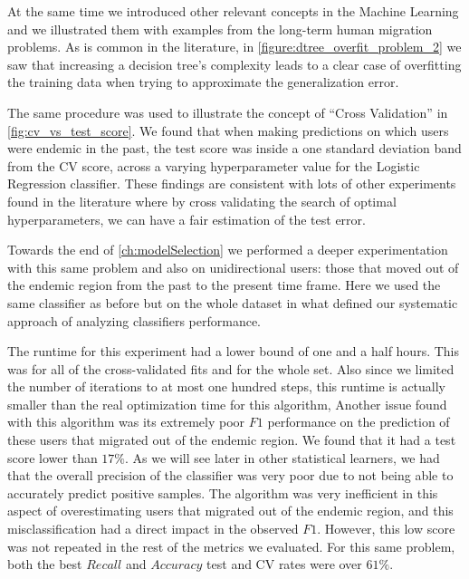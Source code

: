 At the same time we introduced other relevant concepts in the Machine Learning and we illustrated them with examples from the long-term human migration problems.
As is common in the literature, in \cref{figure:dtree_overfit_problem_2} we saw that increasing a decision tree's complexity leads to a clear case of overfitting the training data when trying to approximate the generalization error.

The same procedure was used to illustrate the concept of ``Cross Validation'' in \cref{fig:cv_vs_test_score}.
We found that when making predictions on which users were endemic in the past, the test score was inside a one standard deviation band from the CV score, across a varying hyperparameter value for the Logistic Regression classifier.
These findings are consistent with lots of other experiments found in the literature where by cross validating the search of optimal hyperparameters, we can have a fair estimation of the test error.


Towards the end of \cref{ch:modelSelection} we performed a deeper experimentation with this same problem and also on unidirectional users: those that moved out of the endemic region from the past to the present time frame.
Here we used the same classifier as before but on the whole dataset in what defined our systematic approach of analyzing classifiers performance.



The runtime for this experiment had a lower bound of one and a half hours.
This was for all of the cross-validated fits and for the whole set.
Also since we limited the number of iterations to at most one hundred steps, this runtime is actually smaller than the real optimization time for this algorithm,
Another issue found with this algorithm was its extremely poor $F1$ performance on the prediction of these users that migrated out of the endemic region.
We found that it had a test score lower than $17\%$.
As we will see later in other statistical learners, we had that the overall precision of the classifier was very poor due to not being able to accurately predict positive samples.
The algorithm was very inefficient in this aspect of overestimating users that migrated out of the endemic region, and this misclassification had a direct impact in the observed $F1$.
However, this low score was not repeated in the rest of the metrics we evaluated.
For this same problem, both the best $Recall$ and $Accuracy$ test and CV rates were over $61\%$.


